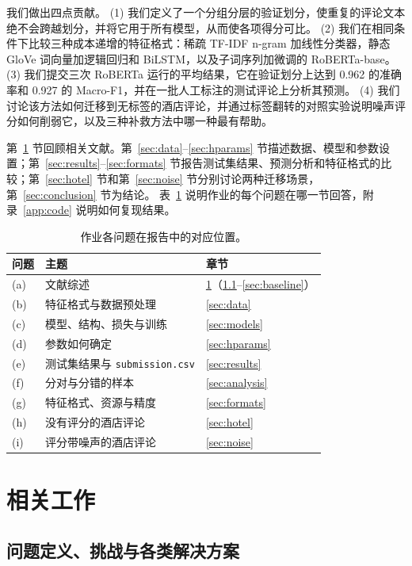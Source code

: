 \documentclass[11pt,a4paper]{article}
\begin{document}
我们做出四点贡献。
(1) 我们定义了一个分组分层的验证划分，使重复的评论文本绝不会跨越划分，并将它用于所有模型，从而使各项得分可比。
(2) 我们在相同条件下比较三种成本递增的特征格式：稀疏 TF-IDF n-gram 加线性分类器，静态 GloVe 词向量加逻辑回归和 BiLSTM，以及子词序列加微调的 RoBERTa-base。
(3) 我们提交三次 RoBERTa 运行的平均结果，它在验证划分上达到 0.962 的准确率和 0.927 的 Macro-F1，并在一批人工标注的测试评论上分析其预测。
(4) 我们讨论该方法如何迁移到无标签的酒店评论，并通过标签翻转的对照实验说明噪声评分如何削弱它，以及三种补救方法中哪一种最有帮助。

第~\ref{sec:related} 节回顾相关文献。第~\ref{sec:data}--\ref{sec:hparams} 节描述数据、模型和参数设置；第~\ref{sec:results}--\ref{sec:formats} 节报告测试集结果、预测分析和特征格式的比较；第~\ref{sec:hotel} 节和第~\ref{sec:noise} 节分别讨论两种迁移场景，第~\ref{sec:conclusion} 节为结论。
表~\ref{tab:intro-map} 说明作业的每个问题在哪一节回答，附录~\ref{app:code} 说明如何复现结果。

\begin{table}[H]
\centering
\caption{作业各问题在报告中的对应位置。}
\label{tab:intro-map}
\small
\begin{tabular}{l l l}
\toprule
问题 & 主题 & 章节 \\
\midrule
(a) & 文献综述 & \ref{sec:related}（\ref{sec:problem}--\ref{sec:baseline}） \\
(b) & 特征格式与数据预处理 & \ref{sec:data} \\
(c) & 模型、结构、损失与训练 & \ref{sec:models} \\
(d) & 参数如何确定 & \ref{sec:hparams} \\
(e) & 测试集结果与 \texttt{submission.csv} & \ref{sec:results} \\
(f) & 分对与分错的样本 & \ref{sec:analysis} \\
(g) & 特征格式、资源与精度 & \ref{sec:formats} \\
(h) & 没有评分的酒店评论 & \ref{sec:hotel} \\
(i) & 评分带噪声的酒店评论 & \ref{sec:noise} \\
\bottomrule
\end{tabular}
\end{table}


\section{相关工作}\label{sec:related}
\subsection{问题定义、挑战与各类解决方案}\label{sec:problem}
\end{document}
